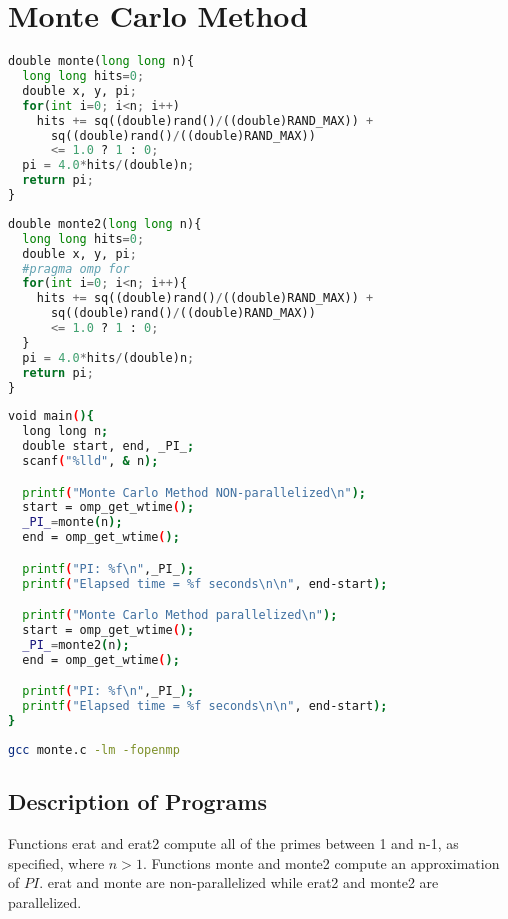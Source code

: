 \documentclass[12pt]{article}
\begin{document}
\section*{Monte Carlo Method}
\begin{lstlisting}[frame=single,language=Python,caption=Non-parallelized Monte Carlo Method (monte.c) \label{code:monte-carlo-nonparallelized}]
double monte(long long n){
  long long hits=0; 
  double x, y, pi;
  for(int i=0; i<n; i++)
    hits += sq((double)rand()/((double)RAND_MAX)) + 
      sq((double)rand()/((double)RAND_MAX)) 
      <= 1.0 ? 1 : 0;
  pi = 4.0*hits/(double)n;
  return pi;
}
\end{lstlisting}
\begin{lstlisting}[frame=single,language=Python,caption=Parallelized Monte Carlo Method (monte.c) \label{code:monte-carlo-parallelized}]
double monte2(long long n){
  long long hits=0; 
  double x, y, pi;
  #pragma omp for
  for(int i=0; i<n; i++){
    hits += sq((double)rand()/((double)RAND_MAX)) + 
      sq((double)rand()/((double)RAND_MAX)) 
      <= 1.0 ? 1 : 0;
  }
  pi = 4.0*hits/(double)n;
  return pi;
}
\end{lstlisting}
\newpage
\begin{lstlisting}[frame=single,language=Bash,caption=Measuring Runtime Performance (monte.c) \label{code:monte-carlo-runtime}]
void main(){
  long long n;
  double start, end, _PI_;
  scanf("%lld", & n);

  printf("Monte Carlo Method NON-parallelized\n");
  start = omp_get_wtime();
  _PI_=monte(n);
  end = omp_get_wtime();

  printf("PI: %f\n",_PI_);
  printf("Elapsed time = %f seconds\n\n", end-start);

  printf("Monte Carlo Method parallelized\n");
  start = omp_get_wtime();
  _PI_=monte2(n);
  end = omp_get_wtime();

  printf("PI: %f\n",_PI_);
  printf("Elapsed time = %f seconds\n\n", end-start);
}
\end{lstlisting}
\begin{lstlisting}[frame=single,language=Bash,caption=Output in Terminal (monte.c) \label{code:monte-carlo-terminal-output}]
 gcc monte.c -lm -fopenmp
\end{lstlisting}

\newpage
\subsection*{Description of Programs}
Functions erat and erat2 compute all of the primes between 1 and n-1, as specified, where $n>1$. 
Functions monte and monte2 compute an approximation of $PI$.
erat and monte are non-parallelized while erat2 and monte2 are parallelized.
\end{document}
